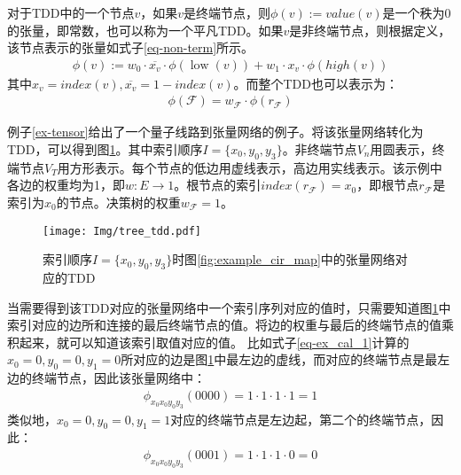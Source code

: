 对于TDD中的一个节点$v$，如果$v$是终端节点，则$\phi\left(v\right):= value (v)$是一个秩为$0$的张量，即常数，也可以称为一个平凡TDD。如果$v$是非终端节点，则根据定义，该节点表示的张量如式子\ref{eq-non-term}所示。
\begin{align}
    \label{eq-non-term}
    \phi(v):=w_{0} \cdot \overline{x_{v}} \cdot \phi(\operatorname{low}(v))+w_{1} \cdot x_{v} \cdot \phi(h i g h(v))
\end{align}
其中$x_v=index\left(v\right),\overline{x_{v}}=1-index\left(v\right)$。而整个TDD也可以表示为：
\begin{align}
    \phi\left(\mathcal{F}\right)=w_{\mathcal{F}}\cdot\phi\left(r_{\mathcal{F}}\right)
\end{align}

\begin{example}
    \label{ex-tdd}
    例子\ref{ex-tensor}给出了一个量子线路到张量网络的例子。将该张量网络转化为TDD，可以得到图\ref{fig:tdd_ex}。其中索引顺序$I=\{x_0,y_0,y_3\}$。非终端节点$V_n$用圆表示，终端节点$V_T$用方形表示。每个节点的低边用虚线表示，高边用实线表示。该示例中各边的权重均为1，即$w:E\rightarrow 1$。根节点的索引$index(r_{\mathcal{F}})=x_0$，即根节点\(r_{\mathcal{F}}\)是索引为\(x_0\)的节点。决策树的权重$w_{\mathcal{F}}=1$。

\begin{figure}[!htbp]
    \centering
    \texttt{[image: Img/tree\_tdd.pdf]}
    \caption{索引顺序$I=\{x_0,y_0,y_3\}$时图\ref{fig:example_cir_map}中的张量网络对应的TDD}   
    \label{fig:tdd_ex}
\end{figure}
当需要得到该TDD对应的张量网络中一个索引序列对应的值时，只需要知道图\ref{fig:tdd_ex}中索引对应的边所和连接的最后终端节点的值。将边的权重与最后的终端节点的值乘积起来，就可以知道该索引取值对应的值。
比如式子\ref{eq-ex_cal_1}计算的\(x_0 = 0, y_0 = 0, y_1 = 0\)所对应的边是图\ref{fig:tdd_ex}中最左边的虚线，而对应的终端节点是最左边的终端节点，因此该张量网络中：
\begin{equation}
    \begin{aligned}
\phi_{x_0x_0y_0y_3}\left(0000\right)
    = 1\cdot 1\cdot 1\cdot 1 = 1
    \end{aligned}
\end{equation}
类似地，\(x_0 = 0, y_0 = 0, y_1 = 1\)对应的终端节点是左边起，第二个的终端节点，因此：
\begin{equation}
    \begin{aligned}
\phi_{x_0x_0y_0y_3}\left(0001\right)
= 1\cdot 1\cdot 1\cdot 0 = 0
    \end{aligned}
\end{equation}
\end{example}
